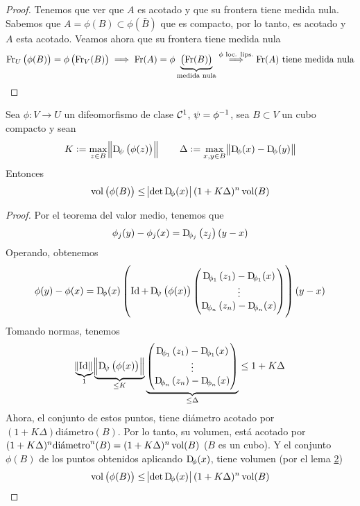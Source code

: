 \begin{proof}
    Tenemos que ver que $A$ es acotado y que su frontera tiene medida nula. Sabemos que $A = \phi(B) \subset \phi\left( \bar{B} \right)$ que es compacto,
    por lo tanto, es acotado y $A$ esta acotado. Veamos ahora que su frontera tiene medida nula
    \[
        \operatorname{Fr}_U\left( \phi(B) \right) = \phi\left( \operatorname{Fr}_V(B) \right) \implies \operatorname{Fr}(A) = \phi\underbrace{\left( \operatorname{Fr}(B) \right)}_{\text{medida nula}}
        \stackrel{\phi \text{ loc. lips.}}{\implies} \operatorname{Fr}(A) \text{ tiene medida nula}
    \]
\end{proof}

\begin{lema*}[6]\label{lema:seis_cambio}
    Sea $\phi \colon V \to U$ un difeomorfismo de clase $\mathcal{C}^1$, $\psi = \phi^{-1}$, sea $B \subset V$ un cubo compacto y sean
    \[
        K := \max_{z \in B} \norm{\Dif_{\psi} \left( \phi(z) \right)} \qquad
        \Delta := \max_{x, y \in B} \norm{\Dif_\phi(x) - \Dif_\phi(y)}
    \]
    Entonces
    \[
        \vol\left( \phi(B) \right) \leq \abs{\det \Dif_\phi(x)}(1+K\Delta)^n \vol(B)
    \]
\end{lema*}

\begin{proof}
    Por el teorema del valor medio, tenemos que
    \[
        \phi_j(y) - \phi_j(x) = \Dif_{\phi_j}\left( z_j \right)(y-x)
    \]
    Operando, obtenemos
    \[
        \phi(y) - \phi(x) = \Dif_\phi(x) \left( 
        \Id + \Dif_\psi\left( \phi(x) \right)
        \begin{pmatrix}
            \Dif_{\phi_1}\left( z_1 \right) - \Dif_{\phi_1} (x) \\
            \vdots \\
            \Dif_{\phi_n}\left( z_n \right) - \Dif_{\phi_n}(x)
        \end{pmatrix}
        \right)
        (y-x)
    \]
    Tomando normas, tenemos
    \[
        \underbrace{\norm{\Id}}_{1}
        \underbrace{\norm{\Dif_\psi\left( \phi(x) \right)}}_{\leq K}
        \underbrace{
            \begin{pmatrix}
                \Dif_{\phi_1}\left( z_1 \right) - \Dif_{\phi_1} (x)
                \\ \vdots \\
                \Dif_{\phi_n}\left( z_n \right) - \Dif_{\phi_n} (x)
            \end{pmatrix}
        }_{\leq \Delta} \leq 1 + K\Delta
    \]
    Ahora, el conjunto de estos puntos, tiene diámetro acotado por $(1+K\Delta)\text{diámetro}(B)$. Por lo tanto, su volumen,
    está acotado por $(1+K\Delta)^n\text{diámetro}^n(B) = (1+K\Delta)^n\operatorname{vol}(B)$ ($B$ es un cubo). Y el conjunto $\phi(B)$ de los puntos
    obtenidos aplicando $\Dif_\phi(x)$, tiene volumen (por el lema \hyperref[lema:dos_cambio]{2})
    \[
        \vol\left( \phi(B) \right) \leq \abs{\det \Dif_\phi(x)} (1+K\Delta)^n \vol(B)
    \]
\end{proof}

